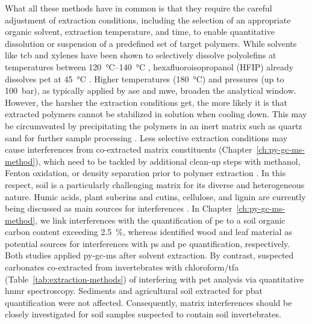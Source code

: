 What all these methods have in common is that they require the careful adjustment of extraction conditions, including the selection of an appropriate organic solvent, extraction temperature, and time, to enable quantitative dissolution or suspension of a predefined set of target polymers. While solvents like \ac{tcb} and xylenes have been shown to selectively dissolve polyolefins at temperatures between \SIrange[range-phrase = { and }]{120}{140}{\degreeCelsius} \citep[Chapter~\ref{ch:py-gc-ms-method};][]{CeccariniHidden2018}, hexafluoroisopropanol (HFIP)
already dissolves \ac{pet} at \SI{45}{\degreeCelsius} \citep{ElertComparison2017}. Higher temperatures
(\SI{180}{\degreeCelsius}) and pressures (up to \SI{100}{\bar}), as typically applied by \ac{ase} and \ac{mwe}, broaden the analytical window. However, the harsher the extraction conditions get, the more likely it is that extracted polymers cannot be stabilized in solution when cooling down. This may be circumvented by precipitating the polymers in an inert matrix such as quartz sand for further sample processing \citep{DierkesQuantification2019}. Less selective extraction conditions may cause interferences from co-extracted matrix constituents (Chapter~\ref{ch:py-gc-ms-method}), which need to be tackled by additional clean-up steps with methanol, Fenton oxidation, or density separation prior to polymer extraction \citep{DierkesQuantification2019,PeezQuantitative2019}. In this respect, soil is a particularly challenging matrix for its diverse and heterogeneous nature. Humic acids, plant suberins and cutins, cellulose,
and lignin are currently being discussed as main sources for interferences \citep[Chapter~\ref{ch:py-gc-ms-method};][]{DierkesQuantification2019,OkoffoIdentification2020}. In Chapter~\ref{ch:py-gc-ms-method}, we link interferences with the quantification of \ac{pe} to a soil organic carbon content exceeding \SI{2.5}{\percent}, whereas \citet{DierkesQuantification2019} identified wood and leaf material as potential sources for interferences with \ac{ps} and \ac{pe}
quantification, respectively. Both studies applied \ac{py-gc-ms} after solvent extraction. By contrast, \citet{PeezQuantitative2019} suspected carbonates co-extracted from invertebrates with chloroform\slash\ac{tfa}
(Table~\ref{tab:extraction-methods}) of interfering with \ac{pet} analysis via quantitative \ac{hnmr} spectroscopy.
Sediments \citep{PeezQuantitative2019} and agricultural soil extracted for \ac{pbat}
quantification \citep{NelsonQuantification2019} were not affected. Consequently,
matrix interferences should be closely investigated for soil samples suspected to contain soil invertebrates.

